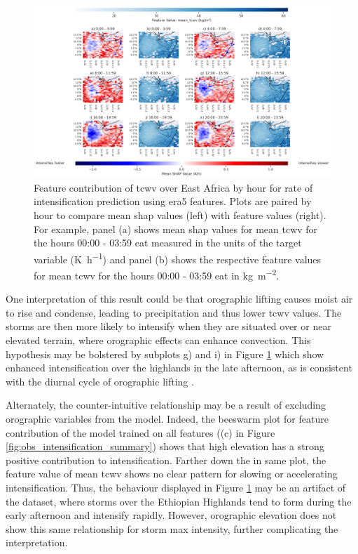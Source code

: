 \begin{figure}[ht]
    \centering
    \includegraphics[width=\textwidth]{../figures/generated/experiments/obs_intensification/geographic_corr/obs_intensification_era5_shap_mean_tcwv_map_by_hour.png}
    \caption{Feature contribution of \acrshort{tcwv} over East Africa by hour for rate of intensification prediction using \acrshort{era5} features. Plots are paired by hour to compare mean \acrshort{shap} values (left) with feature values (right). For example, panel (a) shows mean \acrshort{shap} values for mean \acrshort{tcwv} for the hours 00:00 - 03:59 \acrshort{eat} measured in the units of the target variable (\unit{\kelvin\per\hour}) and panel (b) shows the respective feature values for mean \acrshort{tcwv} for the hours 00:00 - 03:59 \acrshort{eat} in \unit{\kilogram\per\meter\squared}.}
    \label{fig:obs_intensification_era5_shap_mean_tcwv_map_by_hour}
\end{figure}

One interpretation of this result could be that orographic lifting causes moist air to rise and condense, leading to precipitation and thus lower \acrshort{tcwv} values. The storms are then more likely to intensify when they are situated over or near elevated terrain, where orographic effects can enhance convection. This hypothesis may be bolstered by subplots g) and i) in Figure \ref{fig:obs_intensification_era5_shap_mean_tcwv_map_by_hour} which show enhanced intensification over the highlands in the late afternoon, as is consistent with the diurnal cycle of orographic lifting \citep{Colle2015,Negash2024,Zardi2013}.

Alternately, the counter-intuitive relationship may be a result of excluding orographic variables from the model. Indeed, the beeswarm plot for feature contribution of the model trained on all features ((c) in Figure \ref{fig:obs_intensification_summary}) shows that high elevation has a strong positive contribution to intensification. Farther down the in same plot, the feature value of mean \acrshort{tcwv} shows no clear pattern for slowing or accelerating intensification. Thus, the behaviour displayed in Figure \ref{fig:obs_intensification_era5_shap_mean_tcwv_map_by_hour} may be an artifact of the dataset, where storms over the Ethiopian Highlands tend to form during the early afternoon and intensify rapidly. However, orographic elevation does not show this same relationship for storm max intensity, further complicating the interpretation.

